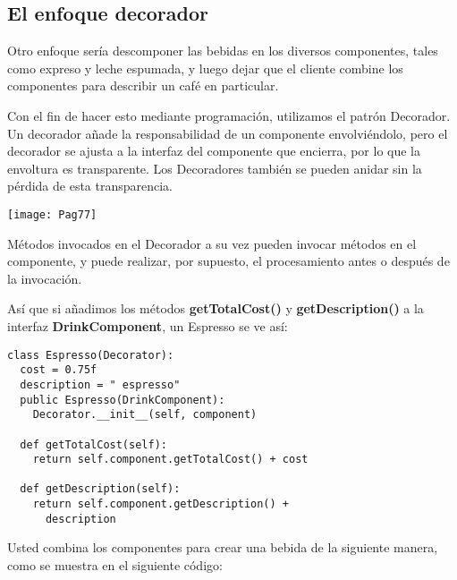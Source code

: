 \subsection*{El enfoque decorador}
\label{subsec:eed}

Otro enfoque sería descomponer las bebidas en los diversos componentes, tales como expreso y leche espumada, y luego dejar que el cliente combine los componentes para describir un café en particular.    \newline

Con el fin de hacer esto mediante programación, utilizamos el patrón Decorador. Un decorador añade la responsabilidad de un componente envolviéndolo, pero el decorador se ajusta a la interfaz del componente que encierra, por lo que la envoltura es transparente. Los Decoradores también se pueden anidar sin la pérdida de esta transparencia. \newline

\texttt{[image: Pag77]}

Métodos invocados en el Decorador a su vez pueden invocar métodos en el componente, y puede realizar, por supuesto, el procesamiento antes o después de la invocación.   \newline

Así que si añadimos los métodos \textbf{getTotalCost()} y \textbf{getDescription()} a la interfaz \textbf{DrinkComponent}, un Espresso se ve así:     \newline

\begin{lstlisting} 
class Espresso(Decorator): 
  cost = 0.75f 
  description = " espresso" 
  public Espresso(DrinkComponent): 
    Decorator.__init__(self, component) 
    
  def getTotalCost(self): 
    return self.component.getTotalCost() + cost 
    
  def getDescription(self): 
    return self.component.getDescription() + 
      description 
\end{lstlisting}

Usted combina los componentes para crear una bebida de la siguiente manera, como se muestra en el siguiente código:     \newline

